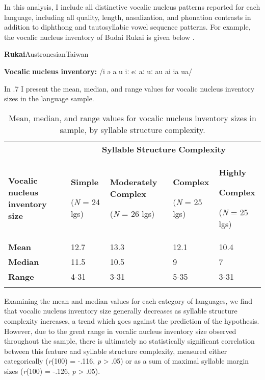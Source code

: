   In this analysis, I include all distinctive vocalic nucleus patterns reported for each language, including all quality, length, nasalization, and phonation contrasts in addition to diphthong and tautosyllabic vowel sequence patterns. For example, the vocalic nucleus inventory of Budai Rukai is given below .

\ea\label{ex:(4.19)}
 \textbf{Rukai}{Austronesian}{Taiwan}

\textbf{Vocalic} \textbf{nucleus} \textbf{inventory:} /i ə a u iː eː aː uː au ai ia ua/

  In .7 I present the mean, median, and range values for vocalic nucleus inventory sizes in the language sample.

\begin{table}
\begin{tabularx}{\textwidth}{XXXXX}
 & \multicolumn{4}{c}{ \textbf{Syllable} \textbf{Structure} \textbf{Complexity}}\\
\lsptoprule
\textbf{Vocalic} \textbf{nucleus} \textbf{inventory} \textbf{size} & { \textbf{Simple}}

 (\textit{N} = 24 lgs) & { \textbf{Moderately} \textbf{Complex}}

 (\textit{N} = 26 lgs) & { \textbf{Complex}}

 (\textit{N} = 25 lgs) & { \textbf{Highly} }

{ \textbf{Complex}}

 (\textit{N} = 25 lgs)\\
\textbf{Mean} & 12.7 & 13.3 & 12.1 & 10.4\\
\textbf{Median} & 11.5 & 10.5 & 9 & 7\\
\textbf{Range} & 4-31 & 3-31 & 5-35 & 3-31\\
\lspbottomrule
\end{tabularx}
\caption{\label{4.7}Mean, median, and range values for vocalic nucleus inventory sizes in sample, by syllable structure complexity.}
\end{table}

\z

  Examining the mean and median values for each category of languages, we find that vocalic nucleus inventory size generally decreases as syllable structure complexity increases, a trend which goes against the prediction of the hypothesis. However, due to the great range in vocalic nucleus inventory size observed throughout the sample, there is ultimately no statistically significant correlation between this feature and syllable structure complexity, measured either categorically (\textit{r}(100) = -.116, \textit{p} > .05) or as a sum of maximal syllable margin sizes (\textit{r}(100) = -.126, \textit{p} > .05). 

